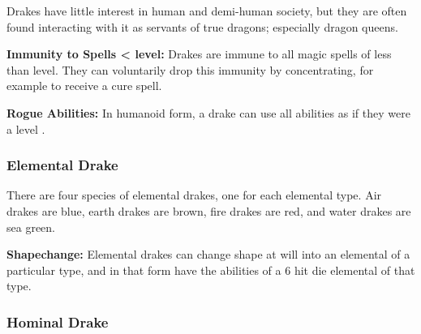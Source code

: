 \begin{multicols*}{2}
Drakes have little interest in human and demi-human society, but they are often found interacting with it as servants of true dragons; especially dragon queens.

\textbf{Immunity to Spells <  level:} Drakes are immune to all magic spells of less than  level. They can voluntarily drop this immunity by concentrating, for example to receive a cure spell.

\textbf{Rogue Abilities:} In humanoid form, a drake can use all  abilities as if they were a  level .

\subsubsection{Elemental Drake}

There are four species of elemental drakes, one for each elemental type. Air drakes are blue, earth drakes are brown, fire drakes are red, and water drakes are sea green.

\textbf{Shapechange:} Elemental drakes can change shape at will into an elemental of a particular type, and in that form have the abilities of a 6 hit die elemental of that type.

\subsubsection{Hominal Drake}
\end{multicols*}
